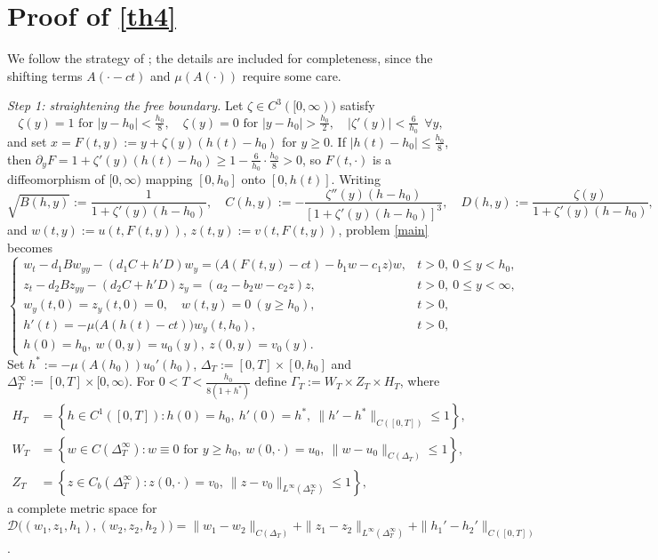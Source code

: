 \documentclass[reqno]{amsart}
\theoremstyle{plain}
\theoremstyle{definition}
\theoremstyle{remark}
\begin{document}
\appendix

\section{Proof of \texorpdfstring{\cref{th4}}{the local existence theorem}}\label{sec_app}

We follow the strategy of \cite[Theorem 2.1]{MR3327894}; the details are included
for completeness, since the shifting terms $A(\cdot-ct)$ and $\mu(A(\cdot))$
require some care.

\textit{Step 1: straightening the free boundary.} Let $\zeta\in C^3([0,\infty))$
satisfy
\[
\zeta(y) = 1 \text{ for } |y - h_0| < \tfrac{h_0}{8}, \quad \zeta(y) = 0 \text{ for } |y - h_0| > \tfrac{h_0}{2}, \quad |\zeta'(y)| < \tfrac{6}{h_0}\ \ \forall y,
\]
and set $x=F(t,y):=y+\zeta(y)(h(t)-h_0)$ for $y\ge0$. If
$|h(t)-h_0|\le\frac{h_0}{8}$, then
$\partial_yF=1+\zeta'(y)(h(t)-h_0)\ge1-\frac{6}{h_0}\cdot\frac{h_0}{8}>0$, so
$F(t,\cdot)$ is a diffeomorphism of $[0,\infty)$ mapping $[0,h_0]$ onto
$[0,h(t)]$. Writing
\[
\sqrt{B(h,y)}:=\frac{1}{1+\zeta'(y)(h-h_0)},\quad
C(h,y):=-\frac{\zeta''(y)(h - h_0)}{[1+\zeta'(y)(h-h_0)]^3},\quad
D(h,y):=\frac{\zeta(y)}{1 + \zeta'(y)(h - h_0)},
\]
and $w(t,y):=u(t,F(t,y))$, $z(t,y):=v(t,F(t,y))$, problem \eqref{main} becomes
\begin{equation}\label{eq:transform}
	\begin{cases}
		w_t - d_1 B w_{yy} - (d_1C + h' D) w_y = \big(A(F(t,y) - ct) - b_1w - c_1z \big)w, & t > 0, ~ 0 \le y < h_0,\\
		z_t - d_2 B z_{yy} - (d_2C + h' D) z_y = \left(a_2 -b_2w -c_2z \right)z, & t >0, ~ 0 \le y < \infty,\\
		w_y(t,0) = z_y(t,0) = 0, \quad w(t, y) = 0 \ (y\ge h_0), & t > 0,\\
		h'(t) = -\mu\big(A(h(t) - ct) \big)  w_y(t, h_0), & t > 0,\\
		h(0) = h_0, ~ w(0, y) = u_0(y),\ z(0, y) = v_0(y). &
	\end{cases}
\end{equation}
Set $h^* := -\mu(A(h_0))u_0'(h_0)$, $\Delta_T := [0,T] \times [0,h_0]$ and
$\Delta_T^\infty := [0, T] \times [0, \infty)$. For
$0 < T < \frac{h_0}{8(1+h^*)}$ define $\Gamma_T := W_T \times Z_T \times H_T$,
where
\begin{align*}
	H_T &= \left\{h \in C^1([0, T]) : h(0) = h_0, ~ h'(0) = h^*, ~ \|h' - h^*\|_{C([0,T])} \le 1 \right\}, \\
	W_T &= \left\{ w \in C(\Delta_T^\infty) : w \equiv 0 \text{ for } y \ge h_0, ~ w(0,\cdot) = u_0, ~ \|w - u_0\|_{C(\Delta_T)} \le 1 \right\}, \\
	Z_T &= \left\{ z \in C_b(\Delta_T^\infty) : z(0,\cdot) = v_0, ~ \|z - v_0\|_{L^\infty(\Delta_T^\infty)} \le 1 \right\},
\end{align*}
a complete metric space for
$\mathcal{D}\big((w_1, z_1, h_1), (w_2, z_2, h_2)\big) = \|w_1 - w_2\|_{C(\Delta_T)}
+ \|z_1 - z_2\|_{L^\infty(\Delta_T^\infty)} + \|h_1' - h_2'\|_{C([0,T])}$.
\end{document}
